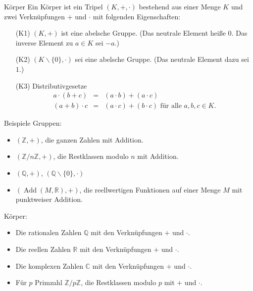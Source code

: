 \documentclass[notes=hide,hyperref={dvipdfmx,pdfpagelabels=false}]{beamer}
\begin{document}
\begin{frame}[fragile]{Körper}
Ein {\color{red} Körper} ist ein Tripel $(K,+,\cdot)$ bestehend aus einer
Menge $K$ und zwei Verknüpfungen $+$ und $\cdot$ mit folgenden
Eigenschaften:
\begin{itemize}
\item [(K1)] $(K,+)$ ist eine abelsche Gruppe. (Das neutrale Element
heiße $0$. Das inverse Element zu $a \in K$ sei $-a$.) 
\item [(K2)] $(K \smallsetminus \{ 0 \}, \cdot)$ sei eine abelsche
Gruppe. (Das neutrale Element dazu sei $1$.)
\item [(K3)] Distributivgesetze
\begin{eqnarray*}
a \cdot (b + c) & = & (a \cdot b) + (a \cdot c)\\
(a+b) \cdot c & = &   (a \cdot c) + (b \cdot c) \mbox{ für alle }
a,b,c \in K.
\end{eqnarray*}
\end{itemize}
\end{frame}

\begin{frame}[fragile]{Beispiele}
Gruppen:
\begin{itemize}
\item $(\mathbb{Z},+)$, die ganzen Zahlen mit Addition.
\item $(\mathbb{Z}/n\mathbb{Z},+)$, die Restklassen modulo $n$ mit Addition.
\item $(\mathbb{Q},+)$, $(\mathbb{Q} \smallsetminus \{ 0 \} ,\cdot)$
\item $(\mathop{Add}(M,\mathbb{R}),+)$, die reellwertigen Funktionen auf einer Menge $M$ mit punktweiser Addition.
\end{itemize} 
Körper:
\begin{itemize}
\item Die rationalen Zahlen $\mathbb{Q}$ mit den Verknüpfungen $+$ und $\cdot$.
\item Die reellen Zahlen $\mathbb{R}$ mit den Verknüpfungen $+$ und $\cdot$.
\item Die komplexen Zahlen $\mathbb{C}$ mit den Verknüpfungen $+$ und $\cdot$.
\item Für $p$ Primzahl $\mathbb{Z}/p\mathbb{Z}$, die Restklassen modulo $p$ mit $+$ und $\cdot$.
\end{itemize}
\end{frame}
\end{document}
